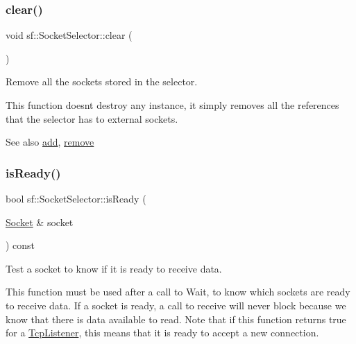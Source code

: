 \subsubsection{\texorpdfstring{clear()}{clear()}}
{\footnotesize\ttfamily void sf\+::\+Socket\+Selector\+::clear (\begin{DoxyParamCaption}{ }\end{DoxyParamCaption})}



Remove all the sockets stored in the selector. 

This function doesn\textquotesingle{}t destroy any instance, it simply removes all the references that the selector has to external sockets.

\begin{DoxySeeAlso}{See also}
\mbox{\hyperlink{classsf_1_1_socket_selector_ade952013232802ff7b9b33668f8d2096}{add}}, \mbox{\hyperlink{classsf_1_1_socket_selector_a98b6ab693a65b82caa375639232357c1}{remove}} \begin{DoxyVerb}\end{DoxyVerb}
 
\end{DoxySeeAlso}
\mbox{\label{classsf_1_1_socket_selector_a917a4bac708290a6782e6686fd3bf889}} 
\subsubsection{\texorpdfstring{isReady()}{isReady()}}
{\footnotesize\ttfamily bool sf\+::\+Socket\+Selector\+::is\+Ready (\begin{DoxyParamCaption}\item[{\mbox{\hyperlink{classsf_1_1_socket}{Socket}} \&}]{socket }\end{DoxyParamCaption}) const}



Test a socket to know if it is ready to receive data. 

This function must be used after a call to Wait, to know which sockets are ready to receive data. If a socket is ready, a call to receive will never block because we know that there is data available to read. Note that if this function returns true for a \mbox{\hyperlink{classsf_1_1_tcp_listener}{Tcp\+Listener}}, this means that it is ready to accept a new connection.


